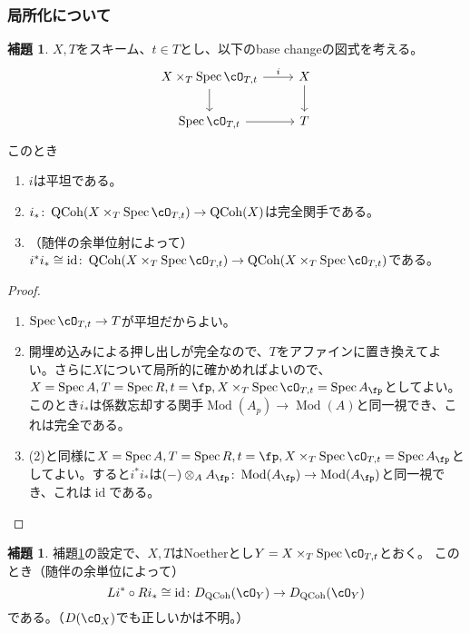 \documentclass[uplatex, a4paper, dvipdfmx]{jsarticle}
\theoremstyle{definition}
\newtheorem{lemma}[theorem]{補題}
\DeclareMathOperator{\id}{\mathrm{id}}
\DeclareMathOperator{\Spec}{\mathrm{Spec}}
\DeclareMathOperator{\QCoh}{\mathrm{QCoh}}
\DeclareMathOperator{\Mod}{\mathrm{Mod}}
\begin{document}
\subsubsection{局所化について}
\begin{lemma}\label{lem:base-change-by-localizaion}
    $X, T$をスキーム、$t \in T$とし、以下のbase changeの図式を考える。
    \[
        \begin{tikzcd}
            X \times_T \Spec \cO_{T, t} \ar[r, "i"] \ar[d]& X \ar[d]\\
            \Spec \cO_{T, t} \ar[r]& T
        \end{tikzcd}
    \]
    このとき
    \begin{enumerate}
        \item $i$は平坦である。
        \item $i_* \colon \QCoh(X \times_T \Spec \cO_{T, t}) \to \QCoh(X)$は完全関手である。
        \item （随伴の余単位射によって）$i^*i_* \cong \id \colon \QCoh( X \times_T \Spec \cO_{T, t}) \to \QCoh( X \times_T \Spec \cO_{T, t})$である。
    \end{enumerate}
\end{lemma}
\begin{proof}
    \begin{enumerate}
        \item $\Spec \cO_{T, t} \to T$が平坦だからよい。
        \item 開埋め込みによる押し出しが完全なので、$T$をアファインに置き換えてよい。さらに$X$について局所的に確かめればよいので、$X = \Spec A, T = \Spec R, t = \fp, X \times_T \Spec \cO_{T, t} = \Spec A_{\fp}$としてよい。このとき$i_*$は係数忘却する関手$\Mod(A_p) \to \Mod(A)$と同一視でき、これは完全である。
        \item (2)と同様に$X = \Spec A, T = \Spec R, t = \fp, X \times_T \Spec \cO_{T, t} = \Spec A_{\fp}$としてよい。すると$i^*i_*$は$(-)\otimes_A A_{\fp} \colon \Mod(A_{\fp}) \to \Mod(A_{\fp})$と同一視でき、これは$\id$である。
    \end{enumerate}
\end{proof}
\begin{lemma}
    補題\ref{lem:base-change-by-localizaion}の設定で、$X, T$はNoetherとし$Y =  X \times_T \Spec \cO_{T, t}$とおく。
    このとき（随伴の余単位によって）
    \begin{equation}
        Li^* \circ Ri_* \cong \id \colon D_{\QCoh}(\cO_Y) \to D_{\QCoh}(\cO_Y)
    \end{equation}
    である。（$D(\cO_X)$でも正しいかは不明。）
\end{lemma}
\end{document}
